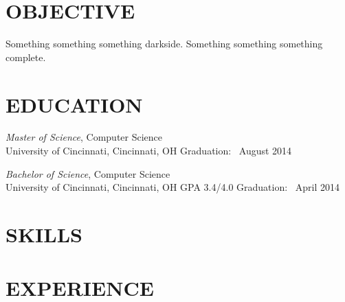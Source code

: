 \documentclass[11pt, line]{res}
\begin{document}
	\address{8228 Melrose Ln\\ Maineville, OH 45039\\ (513) 259-0656\\ ross@rhadden.com}

	\begin{resume}
		\section{OBJECTIVE}
			Something something something darkside.  Something something something complete.

		\section{EDUCATION}
			\textit{Master of Science},
				Computer Science \\
				University of Cincinnati, Cincinnati, OH
				\hfill Graduation: \ August 2014

			\textit{Bachelor of Science},
				Computer Science \\
				University of Cincinnati, Cincinnati, OH
				\hspace{0.2in} GPA 3.4/4.0
				\hfill Graduation: \ April 2014

		\section{SKILLS}

		\section{EXPERIENCE}
	\end{resume}
\end{document}
